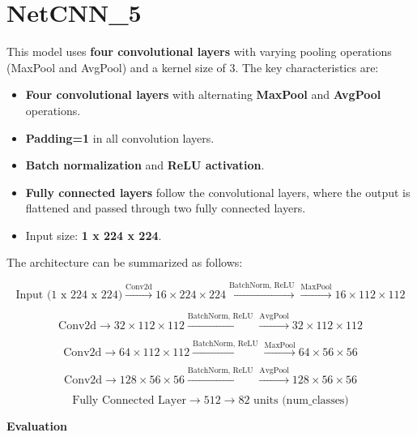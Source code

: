 \documentclass[12pt]{article}
\begin{document}
\section*{NetCNN\_5}
This model uses \textbf{four convolutional layers} with varying pooling operations (MaxPool and AvgPool) and a kernel size of 3. The key characteristics are:
\begin{itemize}
    \item \textbf{Four convolutional layers} with alternating \textbf{MaxPool} and \textbf{AvgPool} operations.
    \item \textbf{Padding=1} in all convolution layers.
    \item \textbf{Batch normalization} and \textbf{ReLU activation}.
    \item \textbf{Fully connected layers} follow the convolutional layers, where the output is flattened and passed through two fully connected layers.
    \item Input size: \textbf{1 x 224 x 224}.
\end{itemize}

The architecture can be summarized as follows:

\[
\text{Input (1 x 224 x 224)} \xrightarrow{\text{Conv2d}} 16 \times 224 \times 224 \xrightarrow{\text{BatchNorm, ReLU}} \xrightarrow{\text{MaxPool}} 16 \times 112 \times 112
\]

\[
\text{Conv2d} \rightarrow 32 \times 112 \times 112 \xrightarrow{\text{BatchNorm, ReLU}} \xrightarrow{\text{AvgPool}} 32 \times 112 \times 112
\]

\[
\text{Conv2d} \rightarrow 64 \times 112 \times 112 \xrightarrow{\text{BatchNorm, ReLU}} \xrightarrow{\text{MaxPool}} 64 \times 56 \times 56
\]

\[
\text{Conv2d} \rightarrow 128 \times 56 \times 56 \xrightarrow{\text{BatchNorm, ReLU}} \xrightarrow{\text{AvgPool}} 128 \times 56 \times 56
\]

\[
\text{Fully Connected Layer} \rightarrow 512 \rightarrow 82 \text{ units (num\_classes)}
\]

\textbf{Evaluation}
\end{document}
